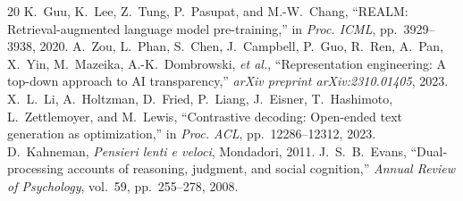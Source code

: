 \documentclass[11pt,a4paper]{article}
\theoremstyle{definition}
\begin{document}
\begin{thebibliography}{20}
 K.~Guu, K.~Lee, Z.~Tung, P.~Pasupat, and M.-W.~Chang, ``REALM: Retrieval-augmented language model pre-training,'' in \textit{Proc. ICML}, pp.~3929--3938, 2020.
 A.~Zou, L.~Phan, S.~Chen, J.~Campbell, P.~Guo, R.~Ren, A.~Pan, X.~Yin, M.~Mazeika, A.-K.~Dombrowski, \textit{et al.}, ``Representation engineering: A top-down approach to AI transparency,'' \textit{arXiv preprint arXiv:2310.01405}, 2023.
 X.~L.~Li, A.~Holtzman, D.~Fried, P.~Liang, J.~Eisner, T.~Hashimoto, L.~Zettlemoyer, and M.~Lewis, ``Contrastive decoding: Open-ended text generation as optimization,'' in \textit{Proc. ACL}, pp.~12286--12312, 2023.
 D.~Kahneman, \textit{Pensieri lenti e veloci}, Mondadori, 2011.
 J.~S.~B.~Evans, ``Dual-processing accounts of reasoning, judgment, and social cognition,'' \textit{Annual Review of Psychology}, vol.~59, pp.~255--278, 2008.
\end{thebibliography}
\end{document}
